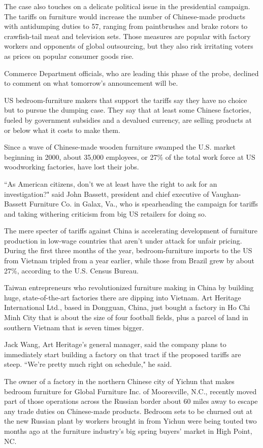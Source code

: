 \documentclass[letterpaper,12pt]{article}
\begin{document}
The case also touches on a delicate political issue in the presidential campaign. The tariffs on furniture would increase the number of Chinese-made products with antidumping duties to 57, ranging from paintbrushes and brake rotors to crawfish-tail meat and television sets. Those measures are popular with factory workers and opponents of global outsourcing, but they also risk irritating voters as prices on popular consumer goods rise.

Commerce Department officials, who are leading this phase of the probe, declined to comment on what tomorrow's announcement will be.

US bedroom-furniture makers that support the tariffs say they have no choice but to pursue the dumping case. They say that at least some Chinese factories, fueled by government subsidies and a devalued currency, are selling products at or below what it costs to make them.

Since a wave of Chinese-made wooden furniture swamped the U.S. market beginning in 2000, about 35,000 employees, or 27\% of the total work force at US woodworking factories, have lost their jobs.

``As American citizens, don't we at least have the right to ask for an investigation?" said John Bassett, president and chief executive of Vaughan-Bassett Furniture Co. in Galax, Va., who is spearheading the campaign for tariffs and taking withering criticism from big US retailers for doing so.

The mere specter of tariffs against China is accelerating development of furniture production in low-wage countries that aren't under attack for unfair pricing. During the first three months of the year, bedroom-furniture imports to the US from Vietnam tripled from a year earlier, while those from Brazil grew by about 27\%, according to the U.S. Census Bureau.

Taiwan entrepreneurs who revolutionized furniture making in China by building huge, state-of-the-art factories there are dipping into Vietnam. Art Heritage International Ltd., based in Dongguan, China, just bought a factory in Ho Chi Minh City that is about the size of four football fields, plus a parcel of land in southern Vietnam that is seven times bigger.

Jack Wang, Art Heritage's general manager, said the company plans to immediately start building a factory on that tract if the proposed tariffs are steep. ``We're pretty much right on schedule," he said.

The owner of a factory in the northern Chinese city of Yichun that makes bedroom furniture for Global Furniture Inc. of Mooresville, N.C., recently moved part of those operations across the Russian border about 60 miles away to escape any trade duties on Chinese-made products. Bedroom sets to be churned out at the new Russian plant by workers brought in from Yichun were being touted two months ago at the furniture industry's big spring buyers' market in High Point, NC.
\end{document}
